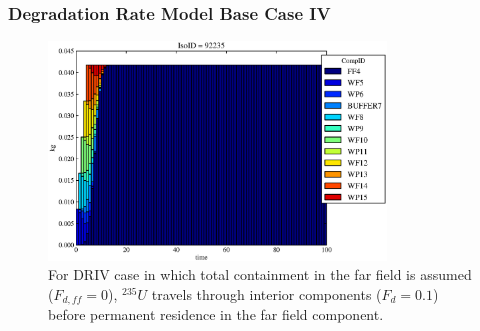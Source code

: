 \begin{frame}[ctb!]
  \frametitle{Degradation Rate Model Base Case IV}

\begin{figure}[ht]
\centering
\includegraphics[width=0.8\textwidth]{./images/drIV.eps}
\caption[$^{235}U$ residence. Degradation Rate Buffer No Release.]{
For DRIV case in which total containment in the far field is assumed ($F_{d,ff}=0$), 
$^{235}U$ travels through interior components ($F_d = 0.1$) before 
permanent residence in the far field component.
}
\label{fig:drIVall}
\end{figure}
\end{frame}


